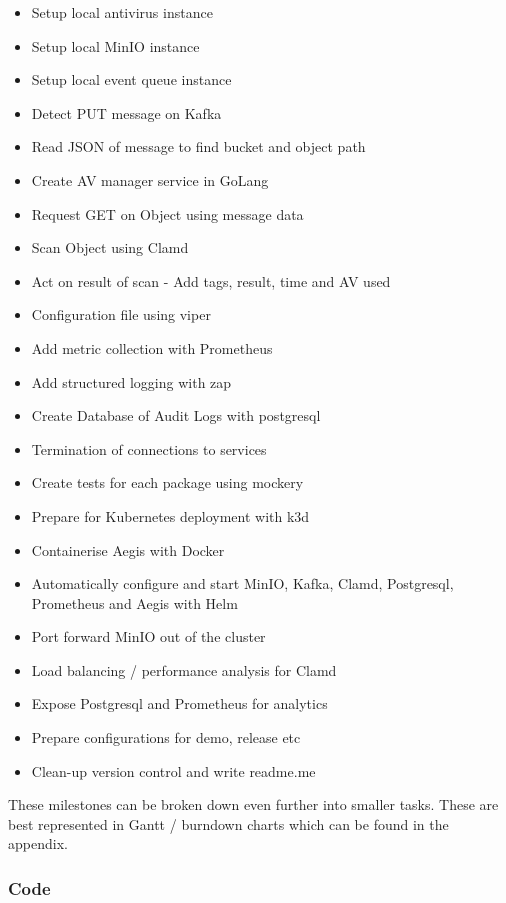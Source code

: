 \documentclass[12pt, conference, final, a4paper, onecolumn, compsoc]{IEEEtran}
\begin{document}
\begin{itemize}
  \item Setup local antivirus instance
  \item Setup local MinIO instance
  \item Setup local event queue instance
  \item Detect PUT message on Kafka
  \item Read JSON of message to find bucket and object path
  \item Create AV manager service in GoLang
  \item Request GET on Object using message data
  \item Scan Object using Clamd
  \item Act on result of scan - Add tags, result, time and AV used
  \item Configuration file using viper
  \item Add metric collection with Prometheus
  \item Add structured logging with zap
  \item Create Database of Audit Logs with postgresql
  \item Termination of connections to services
  \item Create tests for each package using mockery
  \item Prepare for Kubernetes deployment with k3d
  \item Containerise Aegis with Docker
  \item Automatically configure and start MinIO, Kafka, Clamd, Postgresql,
        Prometheus and Aegis with Helm
  \item Port forward MinIO out of the cluster
  \item Load balancing / performance analysis for Clamd
  \item Expose Postgresql and Prometheus for analytics
  \item Prepare configurations for demo, release etc
  \item Clean-up version control and write readme.me
\end{itemize}

These milestones can be broken down even further into smaller tasks. These are
best represented in Gantt / burndown charts which can be found in the appendix.


\subsubsection{Code}
\end{document}
